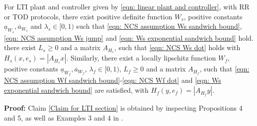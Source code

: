 \begin{claim}
    For LTI plant and controller given by \eqref{eqn: linear plant and controller}, with RR or TOD protocols, there exist positive definite function $W_s$, positive constants $\underline{a}_{W_s}, \overline{a}_{W_s}$ and $\lambda_s \in [0, 1)$ such that \eqref{eqn: NCS assumption Ws sandwich bound}, \eqref{eqn: NCS assumption Ws jump} and \eqref{eqn: Ws exponential sandwich bound} hold. there exist $L_s \geq 0$ and a matrix $A_{H_s}$, such that \eqref{eqn: NCS Ws dot} holds with $H_s(x,e_s) = \left| A_{H_s} x \right|$. Similarly, there exist a locally lipschitz function $W_f$, positive constants $\underline{a}_{W_f}, \overline{a}_{W_f}$, $\lambda_f \in [0, 1)$, $L_f \geq 0$ and a matrix $A_{H_f}$, such that \eqref{eqn: NCS assumption Wf sandwich bound}-\eqref{eqn: NCS Wf dot} and \eqref{eqn: Ws exponential sandwich bound} are satisfied, with $H_f(y,e_f) = \left| A_{H_f} y \right|$.
    \label{Claim for LTI section}
\end{claim}
\textbf{Proof:} Claim \ref{Claim for LTI section} is obtained by inspecting Propositions 4 and 5, as well as Examples 3 and 4 in \cite{dragan_stability}.




